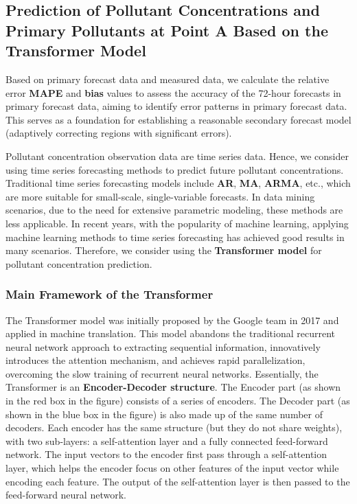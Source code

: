 \documentclass[12pt]{article}
\begin{document}
\subsection{Prediction of Pollutant Concentrations and Primary Pollutants at Point A Based on the Transformer Model}
Based on primary forecast data and measured data, we calculate the relative error \textbf{MAPE} and \textbf{bias} values to assess the accuracy of the 72-hour forecasts in primary forecast data, aiming to identify error patterns in primary forecast data. This serves as a foundation for establishing a reasonable secondary forecast model (adaptively correcting regions with significant errors).

Pollutant concentration observation data are time series data. Hence, we consider using time series forecasting methods to predict future pollutant concentrations. Traditional time series forecasting models include \textbf{AR}, \textbf{MA}, \textbf{ARMA}, etc., which are more suitable for small-scale, single-variable forecasts. In data mining scenarios, due to the need for extensive parametric modeling, these methods are less applicable. In recent years, with the popularity of machine learning, applying machine learning methods to time series forecasting has achieved good results in many scenarios. Therefore, we consider using the \textbf{Transformer model} for pollutant concentration prediction.

\subsubsection{Main Framework of the Transformer}

The Transformer model was initially proposed by the Google team in 2017 and applied in machine translation. This model abandons the traditional recurrent neural network approach to extracting sequential information, innovatively introduces the attention mechanism, and achieves rapid parallelization, overcoming the slow training of recurrent neural networks. Essentially, the Transformer is an \textbf{Encoder-Decoder structure}. The Encoder part (as shown in the red box in the figure) consists of a series of encoders. The Decoder part (as shown in the blue box in the figure) is also made up of the same number of decoders. Each encoder has the same structure (but they do not share weights), with two sub-layers: a self-attention layer and a fully connected feed-forward network. The input vectors to the encoder first pass through a self-attention layer, which helps the encoder focus on other features of the input vector while encoding each feature. The output of the self-attention layer is then passed to the feed-forward neural network.
\end{document}
